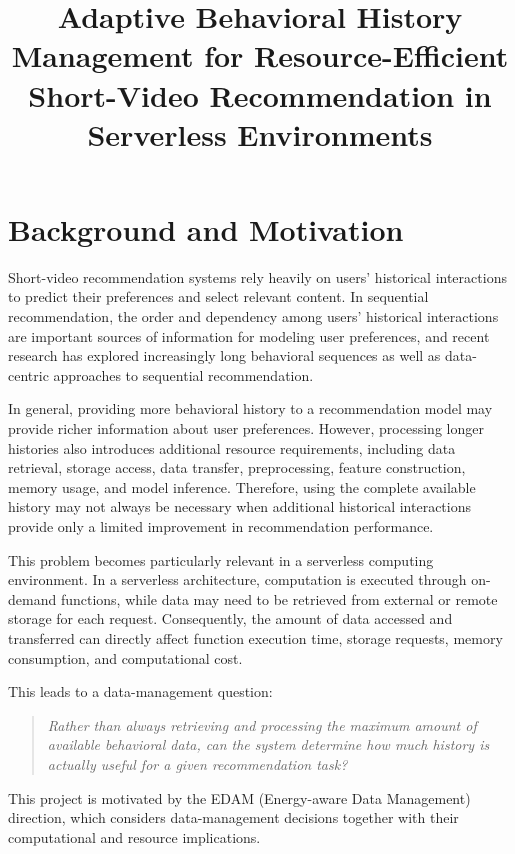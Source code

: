 \documentclass[12pt,a4paper]{article}
\title{\textbf{Adaptive Behavioral History Management for Resource-Efficient Short-Video Recommendation in Serverless Environments}}
\author{}
\date{}
\begin{document}
\maketitle

\section{Background and Motivation}

Short-video recommendation systems rely heavily on users' historical interactions to predict their preferences and select relevant content. In sequential recommendation, the order and dependency among users' historical interactions are important sources of information for modeling user preferences, and recent research has explored increasingly long behavioral sequences as well as data-centric approaches to sequential recommendation.

In general, providing more behavioral history to a recommendation model may provide richer information about user preferences. However, processing longer histories also introduces additional resource requirements, including data retrieval, storage access, data transfer, preprocessing, feature construction, memory usage, and model inference. Therefore, using the complete available history may not always be necessary when additional historical interactions provide only a limited improvement in recommendation performance.

This problem becomes particularly relevant in a serverless computing environment. In a serverless architecture, computation is executed through on-demand functions, while data may need to be retrieved from external or remote storage for each request. Consequently, the amount of data accessed and transferred can directly affect function execution time, storage requests, memory consumption, and computational cost.

This leads to a data-management question:

\begin{quote}
\textit{Rather than always retrieving and processing the maximum amount of available behavioral data, can the system determine how much history is actually useful for a given recommendation task?}
\end{quote}

This project is motivated by the EDAM (Energy-aware Data Management) direction, which considers data-management decisions together with their computational and resource implications.
\end{document}
